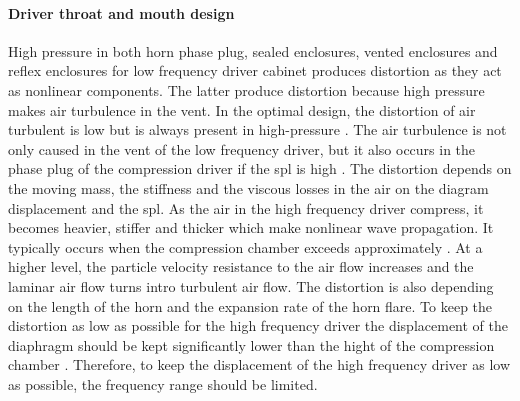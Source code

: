 \paragraph{Driver throat and mouth design} High pressure in both horn phase plug, sealed enclosures, vented enclosures and reflex enclosures for low frequency driver cabinet produces distortion as they act as nonlinear components. The latter produce distortion because high pressure makes air turbulence in the vent. In the optimal design, the distortion of air turbulent is low but is always present in high-pressure \citep{roozen1998reduction}. The air turbulence is not only caused in the vent of the low frequency driver, but it also occurs in the phase plug of the compression driver if the \gls{spl} is high \citep{czerwinski1999air}. The distortion depends on the moving mass, the stiffness and the viscous losses in the air on the diagram displacement and the \gls{spl}. As the air in the high frequency driver compress, it becomes heavier, stiffer and thicker which make nonlinear wave propagation. It typically occurs when the compression chamber exceeds approximately . At a higher level, the particle velocity resistance to the air flow increases and the laminar air flow turns intro turbulent air flow. The distortion is also depending on the length of the horn and the expansion rate of the horn flare. To keep the distortion as low as possible for the high frequency driver the displacement of the diaphragm should be kept significantly lower than the hight of the compression chamber \citep{voishvillo2004comparative}. Therefore, to keep the displacement of the high frequency driver as low as possible, the frequency range should be limited.



